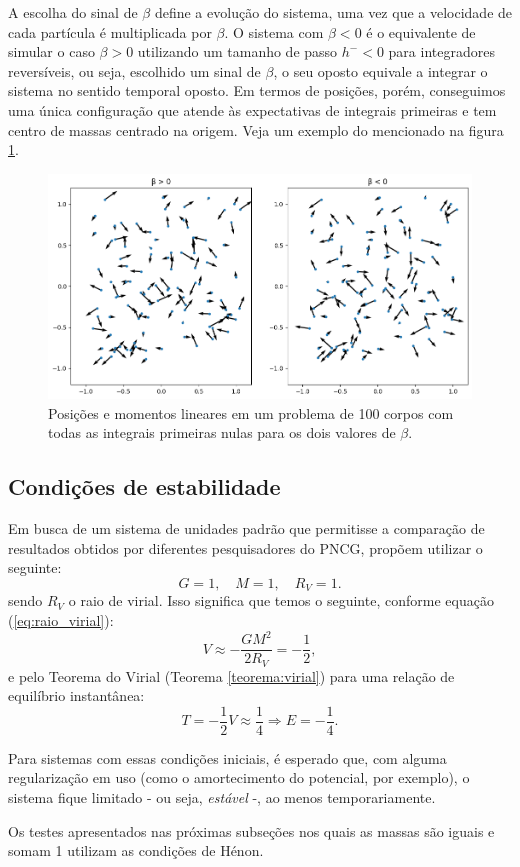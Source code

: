 A escolha do sinal de $\beta$ define a evolução do sistema, uma vez que a velocidade de cada partícula é multiplicada por $\beta$. O sistema com $\beta < 0$ é o equivalente de simular o caso $\beta > 0$ utilizando um tamanho de passo $h^- < 0$ para integradores reversíveis, ou seja, escolhido um sinal de $\beta$, o seu oposto equivale a integrar o sistema no sentido temporal oposto. Em termos de posições, porém, conseguimos uma única configuração que atende às expectativas de integrais primeiras e tem centro de massas centrado na origem. Veja um exemplo do mencionado na figura \ref{fig:vi-betas}.

\begin{figure}
    \centering
    \includegraphics[width=0.8\linewidth]{tcc//img/100corpos_betas.png}
    \caption{Posições e momentos lineares em um problema de 100 corpos com todas as integrais primeiras nulas para os dois valores de $\beta$.}
    \label{fig:vi-betas}
\end{figure}




\subsection{Condições de estabilidade}\label{subsection:condicoes_aarseth}
Em busca de um sistema de unidades padrão que permitisse a comparação de resultados obtidos por diferentes pesquisadores do PNCG, \citep{Hnon1972, Heggie} propõem utilizar o seguinte:
\begin{equation*}
    G = 1, \quad
    M = 1, \quad
    R_V = 1.
\end{equation*}
sendo $R_V$ o raio de virial. Isso significa que temos o seguinte, conforme equação (\ref{eq:raio_virial}):
\begin{equation*}
    V \approx - \dfrac{G M^2}{2 R_V} = - \dfrac{1}{2},
\end{equation*}
e pelo Teorema do Virial (Teorema \ref{teorema:virial}) para uma relação de equilíbrio instantânea:
\begin{equation*}
    T = - \dfrac{1}{2} V \approx \dfrac{1}{4} 
    \Rightarrow
    E = - \dfrac{1}{4}.
\end{equation*}

Para sistemas com essas condições iniciais, é esperado que, com alguma regularização em uso (como o amortecimento do potencial, por exemplo), o sistema fique limitado - ou seja, \textit{estável} -, ao menos temporariamente.

Os testes apresentados nas próximas subseções nos quais as massas são iguais e somam 1 utilizam as condições de Hénon.
